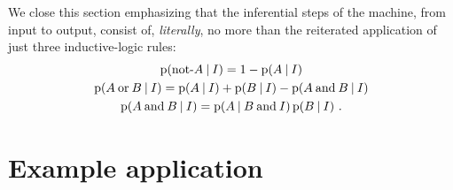 \documentclass[utf8]{FrontiersinHarvard_mod} %
\newcommand*{\p}{\mathrm{p}}%
\renewcommand*{\|}[1][]{\nonscript\:#1\vert\nonscript\:\mathopen{}}
\begin{document}
We close this section emphasizing that the inferential steps of the machine, from input to output, consist of, \emph{literally}, no more than the reiterated application of just three inductive-logic rules:
\begin{equation*}
\begin{gathered}
\p(\textrm{not-}A \| I) = 1-\p(A\|I)\\
\p(A\mathbin{\textrm{or}}B \|I) =
\p(A \|I) + \p(B \|I) -
\p(A\mathbin{\textrm{and}}B \|I) \\
\p(A\mathbin{\textrm{and}}B \|I) =
\p(A \| B\mathbin{\textrm{and}} I) \,
\p(B \|I) \ .
\end{gathered}
\end{equation*}




\bigskip%
\section{Example application}
\label{sec:application}
\end{document}
